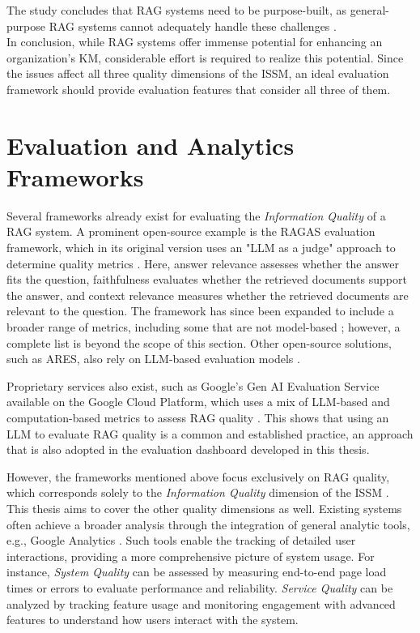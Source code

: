 \documentclass[
	english,
	ruledheaders=section,%
	class=report,%
	thesis={type=bachelor},%
	accentcolor=1b,%
	custommargins=true,%
	marginpar=false,%
	parskip=half-,%
	fontsize=11pt,%
	DIV=14,
]{tudapub}
\begin{document}
The study concludes that RAG systems need to be purpose-built, as general-purpose RAG systems cannot adequately handle these challenges \parencite[pp.~6--7]{Bruckhaus2024RAG}.\\
In conclusion, while RAG systems offer immense potential for enhancing an organization's KM, considerable effort is required to realize this potential. Since the issues affect all three quality dimensions of the ISSM, an ideal evaluation framework should provide evaluation features that consider all three of them.
\section{Evaluation and Analytics Frameworks}
Several frameworks already exist for evaluating the \textit{Information Quality} of a RAG system. A prominent open-source example is the RAGAS evaluation framework, which in its original version uses an "LLM as a judge" approach to determine quality metrics \parencite[pp.~123--124]{Es2024}. Here, answer relevance assesses whether the answer fits the question, faithfulness evaluates whether the retrieved documents support the answer, and context relevance measures whether the retrieved documents are relevant to the question. The framework has since been expanded to include a broader range of metrics, including some that are not model-based \parencite{RagasMetrics}; however, a complete list is beyond the scope of this section. Other open-source solutions, such as ARES, also rely on LLM-based evaluation models \parencite[p.~216]{Saad-Falcon2024}.

Proprietary services also exist, such as Google's Gen AI Evaluation Service available on the Google Cloud Platform, which uses a mix of LLM-based and computation-based metrics to assess RAG quality \parencite{GoogleGenAIEvaluation}. This shows that using an LLM to evaluate RAG quality is a common and established practice, an approach that is also adopted in the evaluation dashboard developed in this thesis.

However, the frameworks mentioned above focus exclusively on RAG quality, which corresponds solely to the \textit{Information Quality} dimension of the ISSM \parencite{DeloneMcLean2003ISSuccessTenYearUpdate}. This thesis aims to cover the other quality dimensions as well. Existing systems often achieve a broader analysis through the integration of general analytic tools, e.g., Google Analytics \parencite{GoogleAnalytics}. Such tools enable the tracking of detailed user interactions, providing a more comprehensive picture of system usage. For instance, \textit{System Quality} \parencite[p.~64]{DeloneMcLean1992ISSuccess} can be assessed by measuring end-to-end page load times or errors to evaluate performance and reliability. \textit{Service Quality} \parencite[p.~18]{DeloneMcLean2003ISSuccessTenYearUpdate} can be analyzed by tracking feature usage and monitoring engagement with advanced features to understand how users interact with the system.
\end{document}
